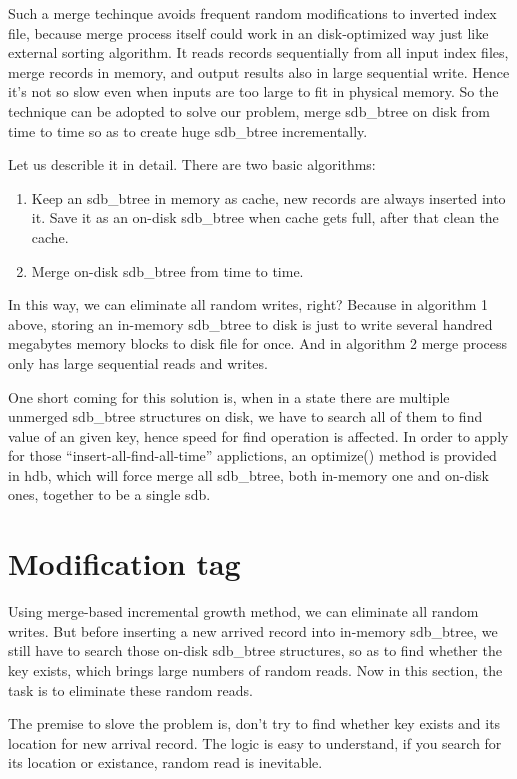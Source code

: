 \documentclass[a4paper,10pt]{article}
\begin{document}
Such a merge techinque avoids frequent random modifications to inverted index file, because merge process itself could work in an disk-optimized way just like external sorting algorithm.
It reads records sequentially from all input index files, merge records in memory, and output results also in large sequential write. Hence it's not so slow even when inputs are too large to fit in physical memory.
So the technique can be adopted to solve our problem, merge sdb\_btree on disk from time to time so as to create huge sdb\_btree incrementally.

Let us describle it in detail. There are two basic algorithms:
\begin{enumerate}
\item Keep an sdb\_btree in memory as cache, new records are always inserted into it. Save it as an on-disk sdb\_btree when cache gets full, after that clean the cache.
\item Merge on-disk sdb\_btree from time to time.
\end{enumerate}

In this way, we can eliminate all random writes, right? Because in algorithm 1 above, storing an in-memory sdb\_btree to disk is just to write several handred megabytes memory blocks to disk file for once.
And in algorithm 2 merge process only has large sequential reads and writes.

One short coming for this solution is, when in a state there are multiple unmerged sdb\_btree structures on disk, we have to search all of them to find value of an given key, hence speed for find operation is affected.
In order to apply for those ``insert-all-find-all-time'' applictions, an optimize() method is provided in hdb, which will force merge all sdb\_btree, both in-memory one and on-disk ones, together to be a single sdb.

\section{Modification tag}

Using merge-based incremental growth method, we can eliminate all random writes. But before inserting a new arrived record into in-memory sdb\_btree,
we still have to search those on-disk sdb\_btree structures, so as to find whether the key exists, which brings large numbers of random reads.
Now in this section, the task is to eliminate these random reads.

The premise to slove the problem is, don't try to find whether key exists and its location for new arrival record. The logic is easy to understand, if you search for its location or existance, random read is inevitable.
\end{document}
